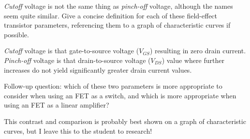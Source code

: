 

{\it Cutoff} voltage is not the same thing as {\it pinch-off} voltage, although the names seem quite similar.  Give a concise definition for each of these field-effect transistor parameters, referencing them to a graph of characteristic curves if possible.







{\it Cutoff} voltage is that gate-to-source voltage ($V_{GS}$) resulting in zero drain current.  {\it Pinch-off} voltage is that drain-to-source voltage ($V_{DS}$) value where further increases do not yield significantly greater drain current values.

\vskip 10pt

Follow-up question: which of these two parameters is more appropriate to consider when using an FET as a switch, and which is more appropriate when using an FET as a linear amplifier?







This contrast and comparison is probably best shown on a graph of characteristic curves, but I leave this to the student to research!




